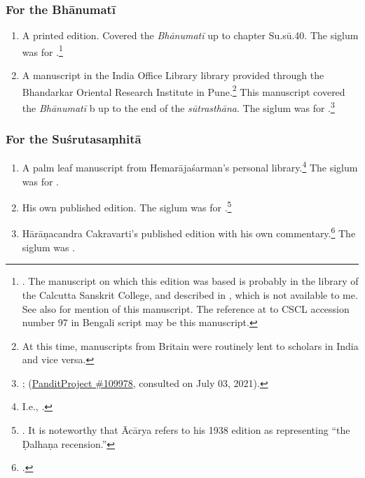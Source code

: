 \subsubsection{For the Bhānumatī}

\begin{enumerate}
    \item A printed edition.  Covered the \emph{Bhānumatī} up to chapter Su.sū.40.
    The siglum was  for .\footnote{\cite{sena-1886}.  
    The
    manuscript on which this edition was based is probably in the library of the
    Calcutta Sanskrit College, and described in \cite[v.\,X.1]{sast-1917}, which
    is not available to me.  See also \cite[IB, 495, n.\,57]{meul-hist} for
    mention of this manuscript.  The reference at \cite[217]{rao-sans} to CSCL
    accession number 97 in Bengali script may be this manuscript.}
    
    \item A manuscript in the India Office Library library provided through the
    Bhandarkar Oriental Research Institute in Pune.\footnote{At this time,
    manuscripts from Britain were routinely lent to scholars in India and vice
    versa.} This manuscript covered the \emph{Bhānumatī} b up to the end of the
    \emph{sūtrasthāna}.  The siglum was  for
    .\footnote{\cite{PP109978}; 
    (\href{panditproject.org/entity/109978/manuscript}{PanditProject \#109978},
    consulted on July 03, 2021).}
\end{enumerate}

\subsubsection{For the Suśrutasaṃhitā}

\begin{enumerate}
    \item A palm leaf manuscript from Hemarājaśarman's personal
    library.\footnote{I.e., .}  The siglum was
     for .
    
    \item His own published edition. The siglum was  for 
    .\footnote{\cite{vulgate}.  It is noteworthy that Ācārya refers to
    his 1938 edition as representing “the Ḍalhaṇa recension.”}
    
    \item Hārāṇacandra Cakravarti's published edition with his own
    commentary.\footcite{bhat-1917} The siglum was .
\end{enumerate}
%
